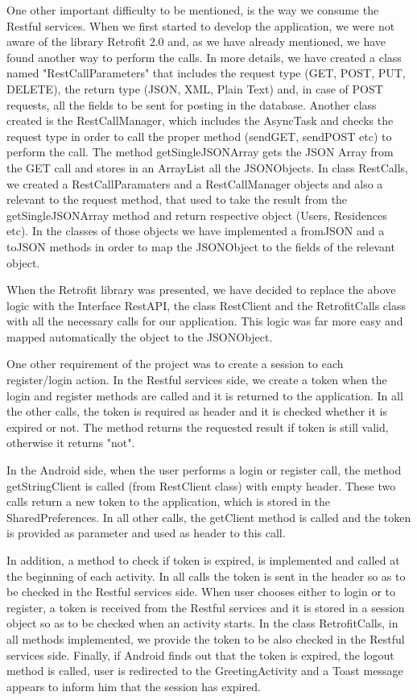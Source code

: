 \documentclass[12pt]{article}
\begin{document}
	One other important difficulty to be mentioned, is the way we consume the Restful services. When we first started to develop the application, we were not aware of the library Retrofit 2.0 and, as we have already mentioned, we have found another way to perform the calls. In more details, we have created a class named "RestCallParameters" that includes the request type (GET, POST, PUT, DELETE), the return type (JSON, XML, Plain Text) and, in case of POST requests, all the fields to be sent for posting in the database. Another class created is the RestCallManager, which includes the AsyncTask and checks the request type in order to call the proper method (sendGET, sendPOST etc) to perform the call. The method getSingleJSONArray gets the JSON Array from the GET call and stores in an ArrayList all the JSONObjects. In class RestCalls, we created a RestCallParamaters and a RestCallManager objects and also a relevant to the request method, that used to take the result from the getSingleJSONArray method and return respective object (Users, Residences etc). In the classes of those objects we have implemented a fromJSON and a toJSON methods in order to map the JSONObject to the fields of the relevant object.
	
	When the Retrofit library was presented, we have decided to replace the above logic with the Interface RestAPI, the class RestClient and the RetrofitCalls class with all the necessary calls for our application. This logic was far more easy and mapped automatically the object to the JSONObject.
	
	One other requirement of the project was to create a session to each register/login action. In the Restful services side, we create a token when the login and register methods are called and it is returned to the application. In all the other calls, the token is required as header and it is checked whether it is expired or not. The method returns the requested result if token is still valid, otherwise it returns "not".
	
	In the Android side, when the user performs a login or register call, the method getStringClient is called (from RestClient class) with empty header. These two calls return a new token to the application, which is stored in the SharedPreferences. In all other calls, the getClient method is called and the token is provided as parameter and used as header to this call.
	
	In addition, a method to check if token is expired, is implemented and called at the beginning of each activity. In all calls the token is sent in the header  so as to be checked in the Restful services side. When user chooses either to login or to register, a token is received from the Restful services and it is stored in a session object so as to be checked when an activity starts. In the class RetrofitCalls, in all methods implemented, we provide the token to be also checked in the Restful services side. Finally, if Android finds out that the token is expired, the logout method is called, user is redirected to the GreetingActivity and a Toast message appears to inform him that the session has expired.
	
\end{document}
